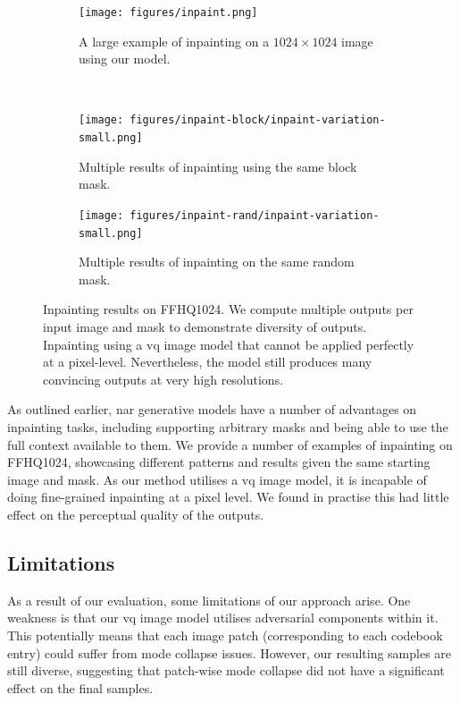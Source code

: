 \begin{figure}[h]
    \centering
    \begin{subfigure}[b]{\textwidth}
        \centering
        \label{fig:inpaintExample}
        \texttt{[image: figures/inpaint.png]}
        \caption{A large example of inpainting on a $1024 \times 1024$ image using our
        model.}
    \end{subfigure}
    \\
    \begin{subfigure}[b]{0.47\textwidth}
        \centering
        \texttt{[image: figures/inpaint-block/inpaint-variation-small.png]}
        \caption{
            Multiple results of inpainting using the same block mask.
        }
    \end{subfigure}
    \hfill
    \begin{subfigure}[b]{0.47\textwidth}
        \centering
        \texttt{[image: figures/inpaint-rand/inpaint-variation-small.png]}
        \caption{
            Multiple results of inpainting on the same random mask. 
        }
    \end{subfigure}
    \caption{
        Inpainting results on FFHQ1024. We compute multiple outputs per input
        image and mask to demonstrate diversity of outputs. Inpainting using a
        \gls{vq} image model that cannot be applied perfectly at a pixel-level.
        Nevertheless, the model still produces many convincing outputs at very
        high resolutions.
    }
\end{figure}

As outlined earlier, \acrlong{nar} generative models have a number of advantages
on inpainting tasks, including supporting arbitrary masks and being able to use
the full context available to them. We provide a number of examples of
inpainting on FFHQ1024, showcasing different patterns and results given the same
starting image and mask. As our method utilises a \gls{vq} image model, it is
incapable of doing fine-grained inpainting at a pixel level. We found in
practise this had little effect on the perceptual quality of the outputs.

\subsection{Limitations}
\label{subsec:evaluationLimitation}

As a result of our evaluation, some limitations of our approach arise. One
weakness is that our \gls{vq} image model utilises adversarial components
within it. This potentially means that each image patch (corresponding to each
codebook entry) could suffer from mode collapse issues. However, our
resulting samples are still diverse, suggesting that patch-wise mode collapse
did not have a significant effect on the final samples.

